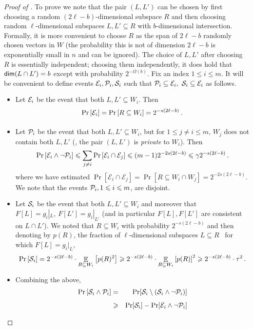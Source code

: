 \documentclass{toc}
\newcommand\Prob[2]{{\Pr_{#1}\left[ {#2} \right]}}
\newcommand\Expect[2]{{\mathop{\mathbb{E}}_{#1}\left[ {#2} \right]}}
\renewcommand\geq{\geqslant}
\renewcommand\ge{\geqslant}
\renewcommand\leq{\leqslant}
\renewcommand\le{\leqslant}
\def\cE{\mathcal{E}}
\begin{document}
\begin{proof}[Proof of ]
To prove  we note that the pair $(L, L')$ can be chosen by first choosing a random $(2\ell-b)$-dimensional subspace $R$ and then choosing random $\ell$-dimensional subspaces
$L, L' \subseteq R$ with $b$-dimensional intersection.
Formally, it is more convenient to choose $R$ as the span of $2\ell-b$ randomly chosen vectors
in $W$ (the probability this is not of dimension $2\ell-b$ is exponentially small in $n$ and can be ignored).%
The choice of $L, L'$ after choosing $R$ is essentially independent;
choosing them independently,  it does hold
that ${\sf dim}(L \cap L') = b$ except with probability $2^{-\Omega(b)}$. Fix an index $1 \leq i \leq m$. It will be convenient to define events
${\cal E}_i,  {\cal P}_i, {\cal S}_i$ such that ${\cal P}_i \subseteq {\cal E}_i, ~{\cal S}_i \subseteq {\cal E}_i$  as follows.
\begin{itemize}
\item Let ${\cal E}_i$ be the event that both $L, L' \subseteq W_i$. Then
\[
\Prob{}{ {\cal E}_i} = \Prob{}{R \subseteq W_i} = 2^{-s(2\ell-b)}\,.
\]
\item Let ${\cal P}_i$ be the event that both $L, L' \subseteq W_i$, but for $1 \leq j \not= i \leq m$, $W_j$ does not contain both $L, L'$ (\ie,
      the pair $(L, L')$ is {\it private} to $W_i$).
Then
       \[\Prob{}{ \cE_i \wedge \neg{\cal P}_i} \leq \sum_{j\not= i} \Prob{}{ {\cal E}_i \cap {\cal E}_j }  \le (m-1) 2^{-2s (2\ell-b)} \leq \gamma 2^{-s(2\ell-b)}\,.\]
      where we have estimated $\Pr[\cE_i\cap \cE_j] = \Pr[ R \subseteq W_i\cap W_j ] = 2^{-2s(2\ell-b)}$.
      We note that the events ${\cal P}_i, 1 \leq i \leq m$, are disjoint.
\item Let ${\cal S}_i$ be the event that both $L, L' \subseteq W_i$ and moreover that $F[L] = g_i|_L, ~F[L'] = g_i|_{L'}$ (and in particular
      $F[L], F[L']$ are consistent on $L \cap L'$). We noted that $R \subseteq W_i$ with probability $2^{-s(2\ell-b)}$ and then denoting by
 $p(R)$, the fraction of $\ell$-dimensional subspaces $L \subseteq R$ ~for which $F[L] = g_i|_L$,
       \[\Prob{}{{\cal S}_i} =  2^{-s(2\ell-b)}\cdot \Expect{R \subseteq W_i}{p(R)^2} \geq  2^{-s(2\ell-b)}\cdot \Expect{R \subseteq W_i}{p(R)}^2 \geq  2^{-s(2\ell-b)}\cdot \tau^2\,. \]
\item Combining the above,
\begin{eqnarray*}
\Prob{}{ {\cal S}_i \wedge {\cal P}_i } &=& \Pr[ {\cal S}_i \setminus ({\cal S}_i \wedge \neg {\cal P}_i )] \\
&\ge& \Pr[{\cal S}_i]
 - \Pr[\cE_i \wedge\neg{\cal P}_i] \\

\end{eqnarray*}
\end{itemize}
\end{proof}
\end{document}
